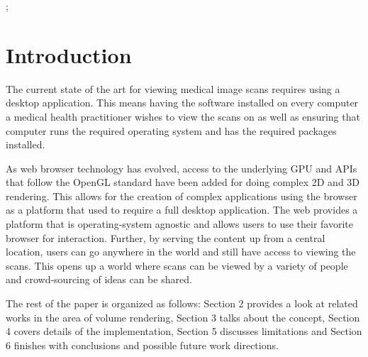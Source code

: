 \documentclass[annual]{acmsiggraph}
\begin{document}
\begin{CRcatlist}
  ;
\end{CRcatlist}


\keywordlist


\TOGlinkslist


\copyrightspace


\section{Introduction}
The current state of the art for viewing medical image scans requires using a desktop application.  This means having the software installed on every computer a medical health practitioner wishes to view the scans on as well as ensuring that computer runs the required operating system and has the required packages installed. 

As web browser technology has evolved, access to the underlying GPU and APIs that follow the OpenGL standard have been added for doing complex 2D and 3D rendering.  This allows for the creation of complex applications using the browser as a platform that used to require a full desktop application.  The web provides a platform that is operating-system agnostic and allows users to use their favorite browser for interaction.  Further, by serving the content up from a central location, users can go anywhere in the world and still have access to viewing the scans.  This opens up a world where scans can be viewed by a variety of people and crowd-sourcing of ideas can be shared.

The rest of the paper is organized as follows: Section 2 provides a look at related works in the area of volume rendering, Section 3 talks about the concept, Section 4 covers details of the implementation, Section 5 discusses limitations and Section 6 finishes with conclusions and possible future work directions.
\end{document}
